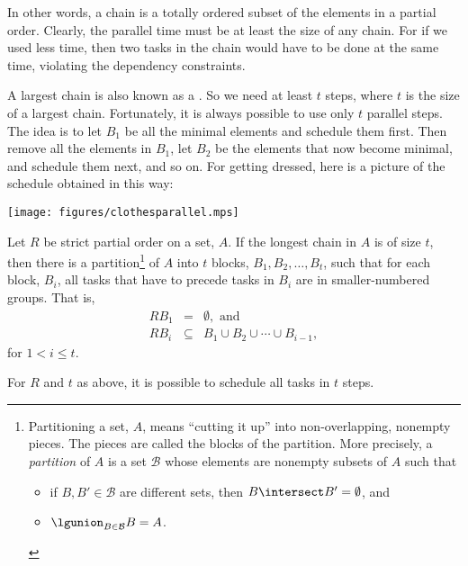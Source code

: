 In other words, a chain is a totally ordered subset of the elements in a
partial order.  Clearly, the parallel time must be at least the size of
any chain.  For if we used less time, then two tasks in the chain would
have to be done at the same time, violating the dependency constraints.

A largest chain is also known as a .  So we need at
least $t$ steps, where $t$ is the size of a largest chain.  Fortunately,
it is always possible to use only $t$ parallel steps.  The idea is to let
$B_1$ be all the minimal elements and schedule them first.  Then remove
all the elements in $B_1$, let $B_2$ be the elements that now become
minimal, and schedule them next, and so on.  For getting dressed, here is
a picture of the schedule obtained in this way:

\begin{center}\texttt{[image: figures/clothesparallel.mps]}\end{center}

\begin{theorem}\label{thm:parallel}
Let $R$ be strict partial order on a set, $A$.  If the longest chain in
$A$ is of size $t$, then there is a partition\footnote{Partitioning a set,
$A$, means ``cutting it up'' into non-overlapping, nonempty pieces.  The
pieces are called the blocks of the partition.  More precisely, a
\emph{partition} of $A$ is a set $\mathcal{B}$ whose elements are nonempty
subsets of $A$ such that
\begin{itemize}
\item if $B,B' \in \mathcal{B}$ are different sets, then $B \intersect B' =
 \emptyset$, and
\item $\lgunion_{B\in \mathcal{B}} B = A$.
\end{itemize}}
of $A$ into $t$ blocks,
$B_1, B_2, \dots, B_t$, such that for each block, $B_i$, all tasks that
have to precede tasks in $B_i$ are in smaller-numbered groups.  That is,
\begin{eqnarray}
RB_1 & = & \emptyset,\text{ and}\label{RA1}\\
RB_i & \subseteq & B_1 \cup B_2 \cup \cdots \cup B_{i-1},\label{RAi}
\end{eqnarray}
for $1<i\le t$.
\end{theorem}

\begin{corollary}
For $R$ and $t$ as above, it is possible to schedule all tasks in $t$
steps.
\end{corollary}

